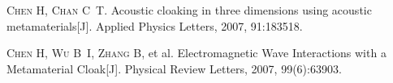 \begin{publications}[99]
    \item\textsc{Chen H, Chan C~T}. {Acoustic cloaking in three dimensions using acoustic metamaterials}[J]. Applied Physics Letters, 2007, 91:183518.
    \item\textsc{Chen H, Wu B~I, Zhang B}, et al. {Electromagnetic Wave Interactions with a Metamaterial Cloak}[J]. Physical Review Letters, 2007, 99(6):63903.
\end{publications}
